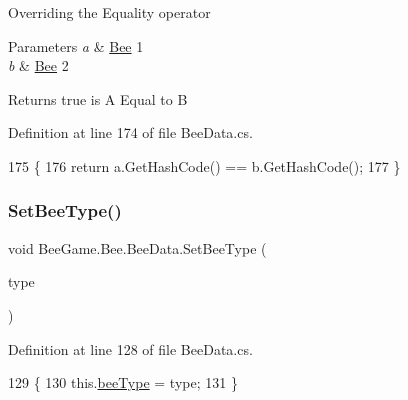 Overriding the Equality operator 


\begin{DoxyParams}{Parameters}
{\em a} & \hyperlink{namespace_bee_game_1_1_bee}{Bee} 1\\
\hline
{\em b} & \hyperlink{namespace_bee_game_1_1_bee}{Bee} 2\\
\hline
\end{DoxyParams}
\begin{DoxyReturn}{Returns}
true is A Equal to B
\end{DoxyReturn}


Definition at line 174 of file Bee\+Data.\+cs.


\begin{DoxyCode}
175         \{
176             \textcolor{keywordflow}{return} a.GetHashCode() == b.GetHashCode();
177         \}
\end{DoxyCode}
\mbox{\label{struct_bee_game_1_1_bee_1_1_bee_data_a3141a8d2ea0b8da9b88fc61dd1134b65}} 
\subsubsection{\texorpdfstring{Set\+Bee\+Type()}{SetBeeType()}}
{\footnotesize\ttfamily void Bee\+Game.\+Bee.\+Bee\+Data.\+Set\+Bee\+Type (\begin{DoxyParamCaption}\item[{\hyperlink{namespace_bee_game_1_1_enums_a9376a1582db99d20c756e24de728944f}{Bee\+Type}}]{type }\end{DoxyParamCaption})}



Definition at line 128 of file Bee\+Data.\+cs.


\begin{DoxyCode}
129         \{
130             this.\hyperlink{struct_bee_game_1_1_bee_1_1_bee_data_acfb6e209ae7bd1b52928580fcce4c743}{beeType} = type;
131         \}
\end{DoxyCode}
\mbox{\label{struct_bee_game_1_1_bee_1_1_bee_data_ae672215675ea4965bd36669043913581}} 
